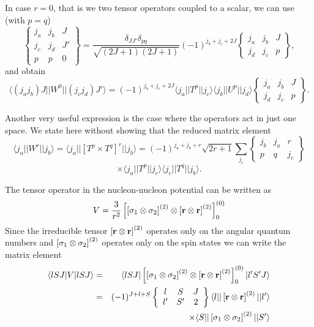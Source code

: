 In case $r=0$, that is we two tensor operators coupled to a scalar, we can use (with $p=q$) 
\[
\left\{\begin{array}{ccc} j_a & j_b& J \\ j_c & j_d & J' \\ p &p & 0\end{array}\right\}=\frac{\delta_{JJ'} \delta_{pq}}{\sqrt{(2J+1)(2J+1)}} (-1)^{j_b+j_c+2J} \begin{Bmatrix} j_a & j_b & J\\ j_d & j_c & p \end{Bmatrix},
\]
and obtain
\[
\langle (j_aj_b)J||W^{0}||(j_cj_d)J'\rangle=(-1)^{j_b+j_c+2J}\langle j_a||T^p||j_c\rangle\langle j_b||U^p||j_d\rangle \begin{Bmatrix} j_a & j_b & J\\ j_d & j_c & p \end{Bmatrix}.
\]

Another very useful expression is the case where the operators act in just one space. We state here without 
showing that the reduced matrix element
\[
\langle j_a||W^{r}||j_b\rangle=\langle j_a||\left[T^p\times T^q\right]^{r}||j_b\rangle= (-1)^{j_a+j_b+r}\sqrt{2r+1} \sum_{j_c}\begin{Bmatrix} j_b & j_a & r\\ p & q & j_c \end{Bmatrix}
\]
\[
\times \langle j_a||T^p||j_c\rangle \langle j_c||T^q||j_b\rangle.
\]

The tensor operator in 
the nucleon-nucleon potential can be written as  
\[
V=\frac{3}{r^{2}}\left[ \left[ {\bf \sigma}_1 \otimes {\bf \sigma}_2\right]^
{(2)} \otimes\left[{\bf r} \otimes {\bf r} \right]^{(2)}\right]^{(0)}_0
\]
Since the irreducible tensor  
$\left[{\bf r} \otimes {\bf r} \right]^{(2)}$
operates  only on the angular quantum numbers and
$\left[{\bf \sigma}_1 \otimes {\bf \sigma}_2\right]^{(2)}$ 
operates  only on 
the spin states we can write the matrix element 
\begin{eqnarray*}
\langle lSJ |V|lSJ\rangle& = &
\langle lSJ |\left[ \left[{\bf \sigma}_1 \otimes {\bf \sigma}_2\right]^{(2)} \otimes
\left[{\bf r} \otimes {\bf r} \right]^{(2)}\right]^{(0)}_0|l'S'J\rangle\\
&  = &
(-1)^{J+l+S}
\left\{\begin{array}{ccc} l&S&J \\ l'&S'&2\end{array}\right\}
\langle l | |\left[{\bf r} \otimes {\bf r} \right]^{(2)} | |l'\rangle\\
& &
\times \langle S | |\left[{\bf \sigma}_1 \otimes {\bf \sigma}_2\right]^{(2)} | |S'\rangle
\end{eqnarray*}

